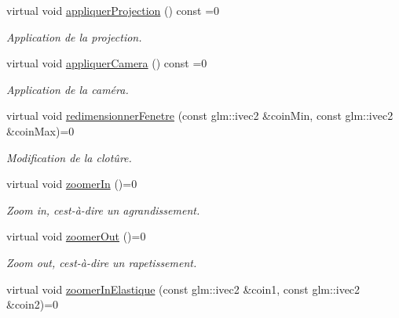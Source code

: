 \begin{DoxyCompactItemize}
\item 
\hypertarget{classvue_1_1_vue_a6cf3a21f4f9c1ff2c24d7075468c92f5}{}virtual void \hyperlink{classvue_1_1_vue_a6cf3a21f4f9c1ff2c24d7075468c92f5}{appliquer\+Projection} () const  =0\label{classvue_1_1_vue_a6cf3a21f4f9c1ff2c24d7075468c92f5}

\begin{DoxyCompactList}\small\item\em Application de la projection. \end{DoxyCompactList}\item 
\hypertarget{classvue_1_1_vue_aa898022079d9e93a690ae4c05a1fd6f3}{}virtual void \hyperlink{classvue_1_1_vue_aa898022079d9e93a690ae4c05a1fd6f3}{appliquer\+Camera} () const  =0\label{classvue_1_1_vue_aa898022079d9e93a690ae4c05a1fd6f3}

\begin{DoxyCompactList}\small\item\em Application de la caméra. \end{DoxyCompactList}\item 
\hypertarget{classvue_1_1_vue_aee55f95ee78ff1588baf1cb1768b6bfe}{}virtual void \hyperlink{classvue_1_1_vue_aee55f95ee78ff1588baf1cb1768b6bfe}{redimensionner\+Fenetre} (const glm\+::ivec2 \&coin\+Min, const glm\+::ivec2 \&coin\+Max)=0\label{classvue_1_1_vue_aee55f95ee78ff1588baf1cb1768b6bfe}

\begin{DoxyCompactList}\small\item\em Modification de la clotûre. \end{DoxyCompactList}\item 
\hypertarget{classvue_1_1_vue_af2fbeaeb97b40dc71d755d4f5e185ab2}{}virtual void \hyperlink{classvue_1_1_vue_af2fbeaeb97b40dc71d755d4f5e185ab2}{zoomer\+In} ()=0\label{classvue_1_1_vue_af2fbeaeb97b40dc71d755d4f5e185ab2}

\begin{DoxyCompactList}\small\item\em Zoom in, c\textquotesingle{}est-\/à-\/dire un agrandissement. \end{DoxyCompactList}\item 
\hypertarget{classvue_1_1_vue_a90d184491ccfb6a93839a2e9bd48bac1}{}virtual void \hyperlink{classvue_1_1_vue_a90d184491ccfb6a93839a2e9bd48bac1}{zoomer\+Out} ()=0\label{classvue_1_1_vue_a90d184491ccfb6a93839a2e9bd48bac1}

\begin{DoxyCompactList}\small\item\em Zoom out, c\textquotesingle{}est-\/à-\/dire un rapetissement. \end{DoxyCompactList}\item 
\hypertarget{classvue_1_1_vue_a1992e78b23c4b3ece118f44f35b97c0e}{}virtual void \hyperlink{classvue_1_1_vue_a1992e78b23c4b3ece118f44f35b97c0e}{zoomer\+In\+Elastique} (const glm\+::ivec2 \&coin1, const glm\+::ivec2 \&coin2)=0\label{classvue_1_1_vue_a1992e78b23c4b3ece118f44f35b97c0e}


\end{DoxyCompactItemize}
